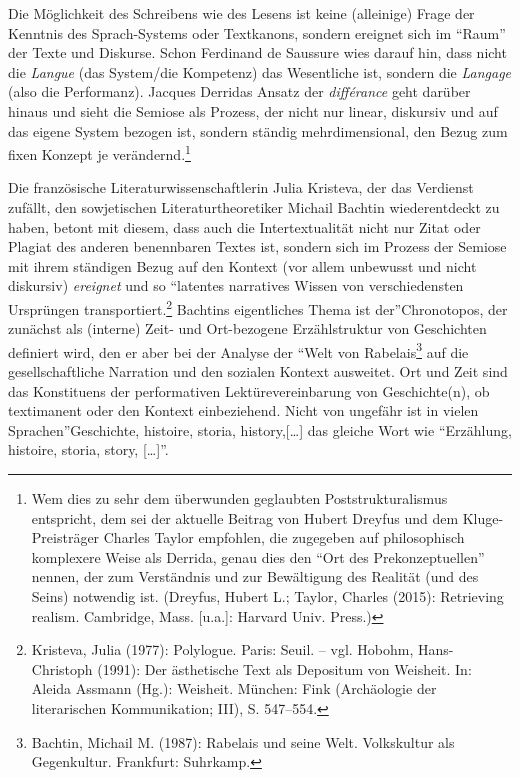 Die Möglichkeit des Schreibens wie des Lesens ist keine (alleinige)
Frage der Kenntnis des Sprach-Systems oder Textkanons, sondern ereignet
sich im \enquote{Raum} der Texte und Diskurse. Schon Ferdinand de Saussure wies
darauf hin, dass nicht die \emph{Langue} (das System/die Kompetenz) das
Wesentliche ist, sondern die \emph{Langage} (also die Performanz).
Jacques Derridas Ansatz der \emph{différance} geht darüber hinaus und
sieht die Semiose als Prozess, der nicht nur linear, diskursiv und auf
das eigene System bezogen ist, sondern ständig mehrdimensional, den
Bezug zum fixen Konzept je verändernd.\footnote{Wem dies zu sehr dem
  überwunden geglaubten Poststrukturalismus entspricht, dem sei der
  aktuelle Beitrag von Hubert Dreyfus und dem Kluge-Preisträger Charles
  Taylor empfohlen, die zugegeben auf philosophisch komplexere Weise als
  Derrida, genau dies den \enquote{Ort des Prekonzeptuellen} nennen, der zum
  Verständnis und zur Bewältigung des Realität (und des Seins) notwendig
  ist. (Dreyfus, Hubert L.; Taylor, Charles (2015): Retrieving realism.
  Cambridge, Mass. {[}u.a.{]}: Harvard Univ. Press.)}

Die französische Literaturwissenschaftlerin Julia Kristeva, der das
Verdienst zufällt, den sowjetischen Literaturtheoretiker Michail Bachtin
wiederentdeckt zu haben, betont mit diesem, dass auch die
Intertextualität nicht nur Zitat oder Plagiat des anderen benennbaren
Textes ist, sondern sich im Prozess der Semiose mit ihrem ständigen
Bezug auf den Kontext (vor allem unbewusst und nicht diskursiv)
\emph{ereignet} und so \enquote{latentes narratives Wissen von
verschiedensten Ursprüngen transportiert.\footnote{Kristeva, Julia
  (1977): Polylogue. Paris: Seuil. -- vgl. Hobohm, Hans-Christoph
  (1991): Der ästhetische Text als Depositum von Weisheit. In: Aleida
  Assmann (Hg.): Weisheit. München: Fink (Archäologie der literarischen
  Kommunikation; III), S. 547--554.} Bachtins eigentliches Thema ist
der}Chronotopos, der zunächst als (interne) Zeit- und Ort-bezogene
Erzählstruktur von Geschichten definiert wird, den er aber bei der
Analyse der \enquote{Welt von Rabelais\footnote{Bachtin, Michail M.
  (1987): Rabelais und seine Welt. Volkskultur als Gegenkultur.
  Frankfurt: Suhrkamp.} auf die gesellschaftliche Narration und den
sozialen Kontext ausweitet. Ort und Zeit sind das Konstituens der
performativen Lektürevereinbarung von Geschichte(n), ob textimanent oder
den Kontext einbeziehend. Nicht von ungefähr ist in vielen
Sprachen}Geschichte, histoire, storia, history,{[}\ldots{}{]} das
gleiche Wort wie \enquote{Erzählung, histoire, storia, story, {[}\ldots{}{]}}.

